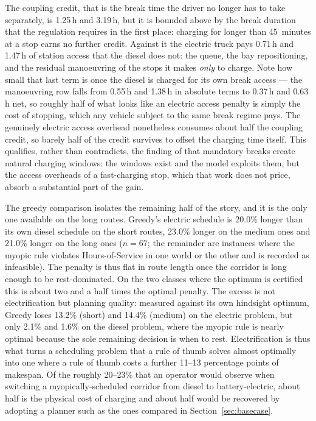 The coupling credit, that is the break time the driver no longer has to take
separately, is 1.25\,h and 3.19\,h, but it is bounded above by the break
duration that the regulation requires in the first place: charging for longer
than 45~minutes at a stop earns no further credit.  Against it the electric
truck pays 0.71\,h and 1.47\,h of station access that the diesel does not: the
queue, the bay repositioning, and the residual manoeuvring of the stops it makes
\emph{only} to charge.  Note how small that last term is once the diesel is
charged for its own break access --- the manoeuvring row falls from 0.55\,h and
1.38\,h in absolute terms to 0.37\,h and 0.63\,h net, so roughly half of what
looks like an electric access penalty is simply the cost of stopping, which any
vehicle subject to the same break regime pays.  The genuinely electric access
overhead nonetheless consumes about half the coupling credit, so barely half of
the credit survives to offset the charging time itself.  This qualifies, rather
than contradicts, the finding of
\citet{brockmann_break-and-charge_2025} that mandatory breaks create natural
charging windows: the windows exist and the model exploits them, but the access
overheads of a fast-charging stop, which that work does not price, absorb a
substantial part of the gain.

The greedy comparison isolates the remaining half of the story, and it is the
only one available on the long routes.  Greedy's electric schedule is 20.0\%
longer than its own diesel schedule on the short routes, 23.0\% longer on the
medium ones and 21.0\% longer on the long ones ($n = 67$; the remainder are
instances where the myopic rule violates Hours-of-Service in one world or the
other and is recorded as infeasible).  The penalty is thus flat in route
length once the corridor is long enough to be rest-dominated.  On the two
classes where the optimum is certified this is about two and a half times the
optimal penalty.  The excess is not electrification but planning quality:
measured against its own hindsight optimum, Greedy loses 13.2\% (short) and
14.4\% (medium) on the electric problem, but only 2.1\% and 1.6\% on the diesel
problem, where the myopic rule is nearly optimal because the sole remaining
decision is when to rest.  Electrification is thus what turns a scheduling
problem that a rule of thumb solves almost optimally into one where a rule of
thumb costs a further 11--13 percentage points of makespan.  Of the roughly
20--23\% that an operator would observe when switching a myopically-scheduled
corridor from diesel to battery-electric, about half is the physical cost of
charging and about half would be recovered by adopting a planner such as the
ones compared in Section~\ref{sec:basecase}.

